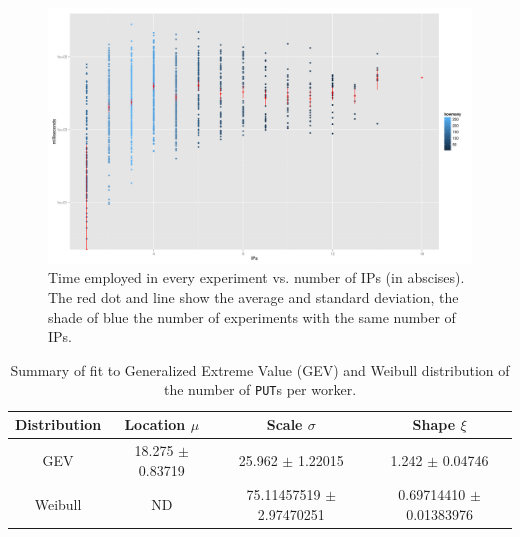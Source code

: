 \documentclass[journal,onecolumn]{IEEEtran}
\begin{document}
\begin{figure}[!htb]
\centering
\includegraphics[width=0.9\linewidth]{img/ips-time-ww.png}
\caption{Time employed in every experiment vs. number of IPs (in abscises). The red dot and line show the average and standard deviation, the shade of blue the number of experiments with the same number of IPs. }
\label{fig:ipstime:w2}
\end{figure}
%
%
\begin{table}
\caption{Summary of fit to Generalized Extreme Value (GEV) and Weibull distribution of
  the number of {\tt PUT}s per worker. \label{tab:puts:ww}}
\begin{center}
\begin{tabular}{cccc}
\hline
Distribution & Location $\mu$ & Scale $\sigma$ & Shape $\xi$ \\
\hline
GEV & 18.275 $\pm$ 0.83719  &  25.962  $\pm$ 1.22015 & 1.242   $\pm$
0.04746 \\
Weibull & ND & 75.11457519 $\pm$ 2.97470251  & 0.69714410 $\pm$ 0.01383976 \\
\hline
\end{tabular}
\end{center}
\end{table}
%
\end{document}

